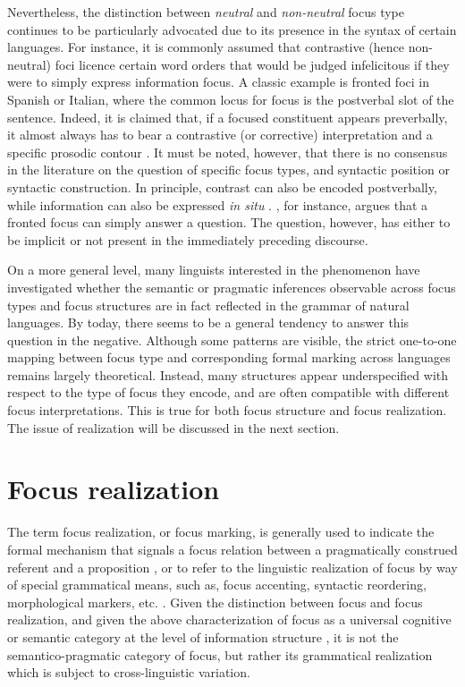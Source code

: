 Nevertheless, the distinction between \textit{neutral} and \textit{non-neutral} focus type continues to be particularly advocated due to its presence in the syntax of certain languages. For instance, it is commonly assumed that contrastive (hence non-neutral) foci licence certain word orders that would be judged infelicitous if they were to simply express information focus. A classic example is fronted foci in Spanish or Italian, where the common locus for focus is the postverbal slot of the sentence. Indeed, it is claimed that, if a focused constituent appears preverbally, it almost always has to bear a contrastive (or corrective) interpretation and a specific prosodic contour \parencite{beninca1988ordine, bianchi2013focus, zubizarreta1999word}. It must be noted, however, that there is no consensus in the literature on the question of specific focus types, and syntactic position or syntactic construction. In principle, contrast can also be encoded postverbally, while information can also be expressed \textit{in situ} \parencite{cruschina2021, cruschina_mayol_2025_gradience_optionality}. \textcite{brunetti2004}, for instance, argues that a fronted focus can simply answer a question. The question, however, has either to be implicit or not present in the immediately preceding discourse.

On a more general level, many linguists interested in the phenomenon  have investigated whether the semantic or pragmatic inferences observable across focus types and focus structures are in fact reflected in the grammar of natural languages.
By today, there seems to be a general tendency to answer this question in the negative. Although some patterns are visible, the strict one-to-one mapping between focus type and corresponding formal marking across languages remains largely theoretical. Instead, many structures appear underspecified with respect to the type of focus they encode, and are often compatible with different focus interpretations. This is  true for both focus structure and focus realization. The issue of realization will be discussed in the next section.

\section{Focus realization}
 The term focus realization, or focus marking, is generally used to indicate the formal mechanism that signals a focus relation between a pragmatically construed referent and a proposition \parencite{lambrecht1996information}, or to refer to the linguistic realization of focus by way of special grammatical means, such as, focus accenting, syntactic reordering, morphological markers, etc. \parencite{buring2009towards}.
Given the distinction between focus and focus realization, and given the above characterization of focus as a universal cognitive or semantic category at the level of information structure \parencite{zimmermann2011focus}, it is not the semantico-pragmatic category of focus, but rather its grammatical realization which is subject to cross-linguistic variation. 

